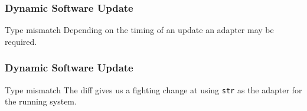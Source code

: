 \documentclass{beamer}
\begin{document}
\begin{frame}[fragile]
  \frametitle{Dynamic Software Update}
  \begin{block}{Type mismatch}
    Depending on the timing of an update an adapter may be required.
  \end{block}

  \begin{example}
    \begin{center}
      \begin{minipage}{.52\textwidth}
       
      \end{minipage}
      \hfill
      \begin{minipage}{.47\textwidth}
        
      \end{minipage}
    \end{center}
  \end{example}
\end{frame}

\begin{frame}[fragile]
  \frametitle{Dynamic Software Update}
  \begin{block}{Type mismatch}
    The diff gives us a fighting change at using \verb|str| as the adapter for the running system.
  \end{block}

  \begin{example}
    
  \end{example}
\end{frame}
\end{document}
